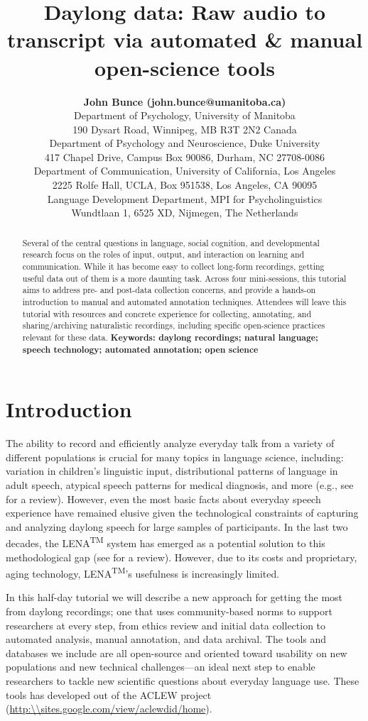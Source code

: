 \documentclass[10pt,letterpaper]{article}
\title{Daylong data: Raw audio to transcript via automated \& manual open-science tools}
\author{{\large \bf John Bunce (john.bunce@umanitoba.ca)} \\
  Department of Psychology, University of Manitoba \\ 190 Dysart Road, Winnipeg, MB R3T 2N2 Canada 
    \AND {\large \bf Elika Bergelson (elika.bergelson@duke.edu)} \\
  Department of Psychology and Neuroscience, Duke University \\ 417 Chapel Drive, Campus Box 90086, Durham, NC 27708-0086
      \AND {\large \bf Anne Warlaumont (warlaumont@ucla.edu)} \\
  Department of Communication, University of California, Los Angeles \\ 2225 Rolfe Hall, UCLA, Box 951538, Los Angeles, CA 90095
  \AND {\large \bf Marisa Casillas (marisa.casillas@mpi.nl)} \\
  Language Development Department, MPI for Psycholinguistics \\
  Wundtlaan 1, 6525 XD, Nijmegen, The Netherlands}
\begin{document}
\maketitle


\begin{abstract}
Several of the central questions in language, social cognition, and developmental research focus on the roles of input, output, and interaction on learning and communication. While it has become easy to collect long-form recordings, getting useful data out of them is a more daunting task. Across four mini-sessions, this tutorial aims to address pre- and post-data collection concerns, and provide a hands-on introduction to manual and automated annotation techniques. Attendees will leave this tutorial with resources and concrete experience for collecting, annotating, and sharing/archiving naturalistic recordings, including specific open-science practices relevant for these data.
\textbf{Keywords: daylong recordings; natural language; speech technology; automated annotation; open science} 
\end{abstract}


\section{Introduction}
The ability to record and efficiently analyze everyday talk from a variety of different populations is crucial for many topics in language science, including: variation in children's linguistic input, distributional patterns of language in adult speech, atypical speech patterns for medical diagnosis, and more (e.g., see  for a review). However, even the most basic facts about everyday speech experience have remained elusive given the technological constraints of capturing and analyzing daylong speech for large samples of participants. In the last two decades, the LENA\textsuperscript{TM} system has emerged as a potential solution to this methodological gap (see  for a review). However, due to its costs and proprietary, aging technology, LENA\textsuperscript{TM}'s usefulness is increasingly limited. 

In this half-day tutorial we will describe a new approach for getting the most from daylong recordings; one that uses community-based norms to support researchers at every step, from ethics review and initial data collection to automated analysis, manual annotation, and data archival. The tools and databases we include are all open-source and oriented toward usability on new populations and new technical challenges---an ideal next step to enable researchers to tackle new scientific questions about everyday language use. These tools has developed out of the ACLEW project (\url{http:\\sites.google.com/view/aclewdid/home}).
\end{document}
